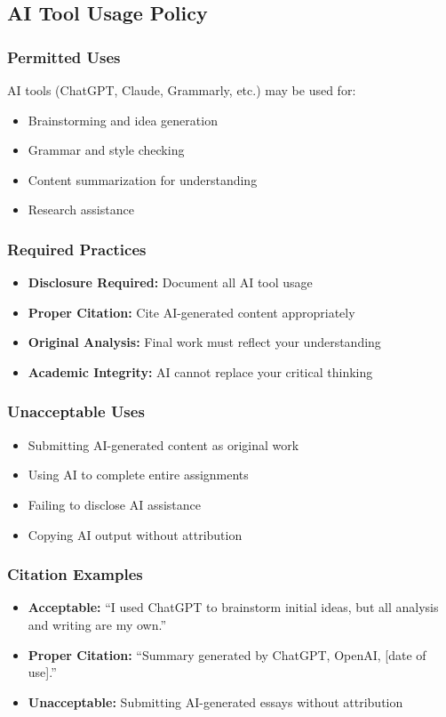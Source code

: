 \documentclass[12pt]{article}
\begin{document}
\subsection*{AI Tool Usage Policy}

\subsubsection*{Permitted Uses}
AI tools (ChatGPT, Claude, Grammarly, etc.) may be used for:
\begin{itemize}
\item Brainstorming and idea generation
\item Grammar and style checking
\item Content summarization for understanding
\item Research assistance
\end{itemize}

\subsubsection*{Required Practices}
\begin{itemize}
\item \textbf{Disclosure Required:} Document all AI tool usage
\item \textbf{Proper Citation:} Cite AI-generated content appropriately
\item \textbf{Original Analysis:} Final work must reflect your understanding
\item \textbf{Academic Integrity:} AI cannot replace your critical thinking
\end{itemize}

\subsubsection*{Unacceptable Uses}
\begin{itemize}
\item Submitting AI-generated content as original work
\item Using AI to complete entire assignments
\item Failing to disclose AI assistance
\item Copying AI output without attribution
\end{itemize}

\subsubsection*{Citation Examples}
\begin{itemize}
\item \textbf{Acceptable:} ``I used ChatGPT to brainstorm initial ideas, but all analysis and writing are my own.''
\item \textbf{Proper Citation:} ``Summary generated by ChatGPT, OpenAI, [date of use].''
\item \textbf{Unacceptable:} Submitting AI-generated essays without attribution
\end{itemize}
\end{document}
